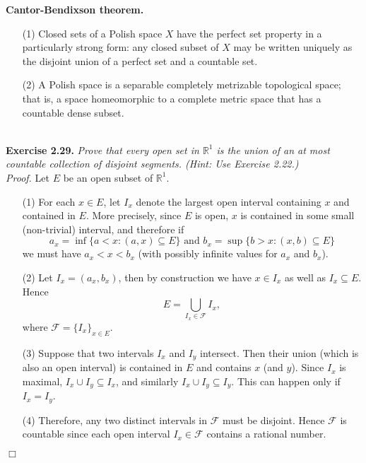 \documentclass{article}
\begin{document}
\textbf{Cantor-Bendixson theorem.}
\begin{enumerate}
\item[(1)]
Closed sets of a Polish space $X$ have the perfect set property in a particularly strong form:
any closed subset of $X$ may be written uniquely as
the disjoint union of a perfect set and a countable set.
\item[(2)]
A Polish space is a separable completely metrizable topological space;
that is, a space homeomorphic to a complete metric space
that has a countable dense subset. \\\\
\end{enumerate}






\textbf{Exercise 2.29.}
\emph{Prove that every open set in $\mathbb{R}^1$ is the union of
an at most countable collection of disjoint segments.
(Hint: Use Exercise 2.22.)} \\

\emph{Proof.}
Let $E$ be an open subset of $\mathbb{R}^1$.
\begin{enumerate}
\item[(1)]
For each $x \in E$, let $I_x$ denote the largest open interval
containing $x$ and contained in $E$.
More precisely, since $E$ is open,
$x$ is contained in some small (non-trivial) interval,
and therefore if
$$a_x = \inf\{ a < x : (a,x) \subseteq E \} \text{ and }
b_x = \sup\{ b > x : (x,b) \subseteq E \}$$
we must have $a_x < x < b_x$ (with possibly infinite values for $a_x$ and $b_x$).
\item[(2)]
Let $I_x = (a_x, b_x)$, then by construction we have $x \in I_x$
as well as $I_x \subseteq E$.
Hence
$$E = \bigcup_{I_x \in \mathscr{F}} I_x,$$
where $\mathscr{F} = \{I_x\}_{x \in E}$.
\item[(3)]
Suppose that two intervals $I_x$ and $I_y$ intersect.
Then their union (which is also an open interval)
is contained in $E$ and contains $x$ (and $y$).
Since $I_x$ is maximal, $I_x \cup I_y \subseteq I_x$,
and similarly $I_x \cup I_y \subseteq I_y$.
This can happen only if $I_x = I_y$.
\item[(4)]
Therefore, any two distinct intervals in $\mathscr{F}$ must be disjoint.
Hence $\mathscr{F}$ is countable since each open interval $I_x \in \mathscr{F}$
contains a rational number.
\end{enumerate}
$\Box$ \\\\
\end{document}
